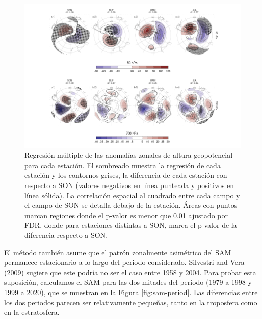 \documentclass[12pt,oneside]{reedthesis}
\begin{document}
\begin{figure}
\includegraphics{figures/30-sam/season-regression-1} \caption{Regresión múltiple de las anomalías zonales de altura geopotencial para cada estación. El sombreado muestra la regresión de cada estación y los contornos grises, la diferencia de cada estación con respecto a SON (valores negativos en línea punteada y positivos en línea sólida). La correlación espacial al cuadrado entre cada campo y el campo de SON se detalla debajo de la estación. Áreas con puntos marcan regiones donde el p-valor es menor que 0.01 ajustado por FDR, donde para estaciones distintas a SON, marca el p-valor de la diferencia respecto a SON.}\label{fig:season-regression}
\end{figure}

El método también asume que el patrón zonalmente asimétrico del SAM permanece estacionario a lo largo del periodo considerado.
Silvestri and Vera (2009) sugiere que este podría no ser el caso entre 1958 y 2004.
Para probar esta suposición, calculamos el SAM para las dos mitades del periodo (1979 a 1998 y 1999 a 2020), que se muestran en la Figura \ref{fig:sam-period}.
Las diferencias entre los dos periodos parecen ser relativamente pequeñas, tanto en la troposfera como en la estratosfera.
\end{document}
